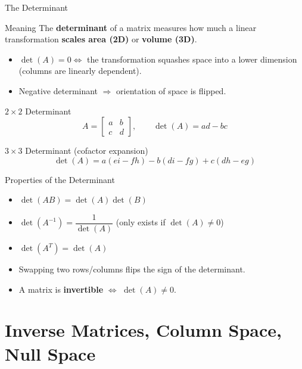 \documentclass[9pt,aspectratio=169]{beamer}
\begin{document}
\begin{frame}{The Determinant}
\begin{block}{Meaning}
The \textbf{determinant} of a matrix measures how much a linear transformation \textbf{scales area (2D)} or \textbf{volume (3D)}.
\end{block}
\begin{itemize}
\item $\det(A) = 0 \iff$ the transformation squashes space into a lower dimension (columns are linearly dependent).
\item Negative determinant $\Rightarrow$ orientation of space is flipped.
\end{itemize}
\begin{exampleblock}{$2\times 2$ Determinant}
$$A=\begin{bmatrix}a&b\\c&d\end{bmatrix}, \qquad \det(A) = ad-bc$$
\end{exampleblock}
\begin{exampleblock}{$3\times 3$ Determinant (cofactor expansion)}
$$\det(A) = a(ei-fh) - b(di-fg) + c(dh-eg)$$
\end{exampleblock}
\end{frame}

\begin{frame}{Properties of the Determinant}
\begin{itemize}
\item $\det(AB) = \det(A)\det(B)$
\item $\det(A^{-1}) = \dfrac{1}{\det(A)}$ \quad (only exists if $\det(A)\neq 0$)
\item $\det(A^T) = \det(A)$
\item Swapping two rows/columns flips the sign of the determinant.
\item A matrix is \textbf{invertible} $\iff$ $\det(A)\neq 0$.
\end{itemize}
\end{frame}

\section{Inverse Matrices, Column Space, Null Space}
\end{document}
